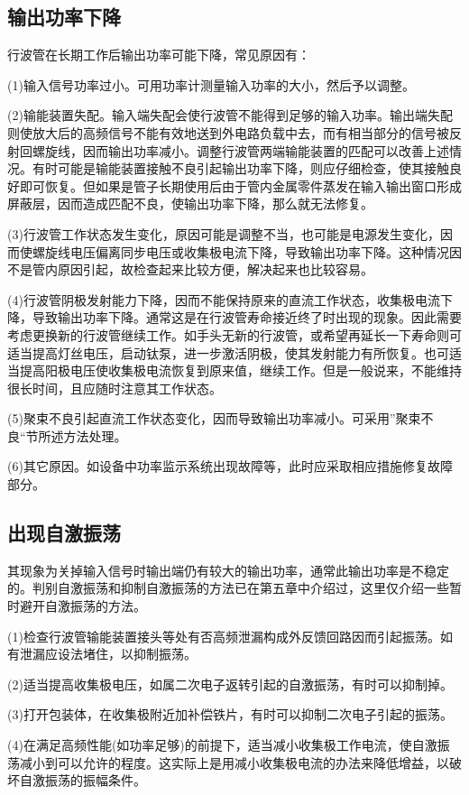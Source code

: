\subsection{输出功率下降}
行波管在长期工作后输出功率可能下降，常见原因有：

(1)输入信号功率过小。可用功率计测量输入功率的大小，然后予以调整。

(2)输能装置失配。输入端失配会使行波管不能得到足够的输入功率。输出端失配则使放大后的高频信号不能有效地送到外电路负载中去，而有相当部分的信号被反射回螺旋线，因而输出功率减小。调整行波管两端输能装置的匹配可以改善上述情况。有时可能是输能装置接触不良引起输出功率下降，则应仔细检查，使其接触良好即可恢复。但如果是管子长期使用后由于管内金属零件蒸发在输入输出窗口形成屏蔽层，因而造成匹配不良，使输出功率下降，那么就无法修复。

(3)行波管工作状态发生变化，原因可能是调整不当，也可能是电源发生变化，因而使螺旋线电压偏离同步电压或收集极电流下降，导致输出功率下降。这种情况因不是管内原因引起，故检查起来比较方便，解决起来也比较容易。

(4)行波管阴极发射能力下降，因而不能保持原来的直流工作状态，收集极电流下降，导致输出功率下降。通常这是在行波管寿命接近终了时出现的现象。因此需要考虑更换新的行波管继续工作。如手头无新的行波管，或希望再延长一下寿命则可适当提高灯丝电压，启动钛泵，进一步激活阴极，使其发射能力有所恢复。也可适当提高阳极电压使收集极电流恢复到原来值，继续工作。但是一般说来，不能维持很长时间，且应随时注意其工作状态。

(5)聚束不良引起直流工作状态变化，因而导致输出功率减小。可采用”聚束不良“节所述方法处理。

(6)其它原因。如设备中功率监示系统出现故障等，此时应采取相应措施修复故障部分。
\subsection{出现自激振荡}
其现象为关掉输入信号时输出端仍有较大的输出功率，通常此输出功率是不稳定的。判别自激振荡和抑制自激振荡的方法已在第五章中介绍过，这里仅介绍一些暂时避开自激振荡的方法。

(1)检查行波管输能装置接头等处有否高频泄漏构成外反馈回路因而引起振荡。如有泄漏应设法堵住，以抑制振荡。

(2)适当提高收集极电压，如属二次电子返转引起的自激振荡，有时可以抑制掉。

(3)打开包装体，在收集极附近加补偿铁片，有时可以抑制二次电子引起的振荡。

(4)在满足高频性能(如功率足够)的前提下，适当减小收集极工作电流，使自激振荡减小到可以允许的程度。这实际上是用减小收集极电流的办法来降低增益，以破坏自激振荡的振幅条件。

